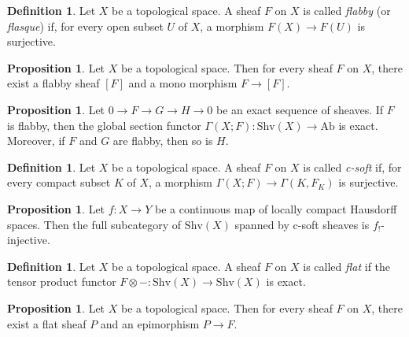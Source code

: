 \documentclass[a4paper,dvipdfmx,11pt,reqno]{amsart}
\newcommand{\Ab}{\mathrm{Ab}}
\newcommand{\Shv}{\mathrm{Shv}}
\theoremstyle{definition}
\newtheorem{definition}[theorem]{Definition}
\newtheorem{proposition}[theorem]{Proposition}
\begin{document}
\begin{definition} \label{Ike.1.2.1}
  Let $X$ be a topological space.
  A sheaf $F$ on $X$ is called \textit{flabby} (or \textit{flasque}) if, for every open subset $U$ of $X$, a morphism $F(X) \to F(U)$ is surjective.
\end{definition}

\begin{proposition}
  Let $X$ be a topological space.
  Then for every sheaf $F$ on $X$, there exist a flabby sheaf $[F]$ and a mono morphism $F \to [F]$.
\end{proposition}

\begin{proposition}
  Let $0 \to F \to G \to H \to 0$ be an exact sequence of sheaves.
  If $F$ is flabby, then the global section functor $\Gamma(X;F) : \Shv(X) \to \Ab$ is exact.
  Moreover, if $F$ and $G$ are flabby, then so is $H$.  
\end{proposition}

\begin{definition} \label{Ike.2.2.12}
  Let $X$ be a topological space.
  A sheaf $F$ on $X$ is called \textit{c-soft} if, for every compact subset $K$ of $X$, a morphism $\Gamma(X;F) \to \Gamma(K,F_{K})$ is surjective.
\end{definition}

\begin{proposition}
  Let $f : X \to Y$ be a continuous map of locally compact Hausdorff spaces.
  Then the full subcategory of $\Shv(X)$ spanned by c-soft sheaves is $f_{!}$-injective.
\end{proposition}

\begin{definition} \label{Ike.2.2.4}
  Let $X$ be a topological space.
  A sheaf $F$ on $X$ is called \textit{flat} if the tensor product functor $F \otimes - : \Shv(X) \to \Shv(X)$ is exact.
\end{definition}

\begin{proposition}
  Let $X$ be a topological space.
  Then for every sheaf $F$ on $X$, there exist a flat sheaf $P$ and an epimorphism $P \to F$.
\end{proposition}

\printbibliography
\end{document}
